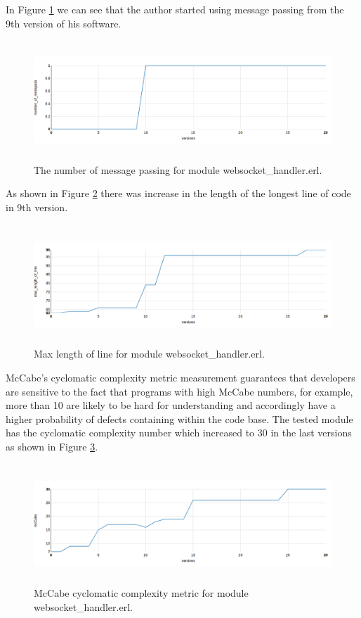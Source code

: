 In Figure \ref{fig:chat} we can see that the author started using message passing from the 9th version of his software.

\begin{figure}[ht]
	\centering
	\includegraphics[height=45mm]{figures/chat.png}
	\caption{The number of message passing for module websocket\_handler.erl.}
	\label{fig:chat}
\end{figure}

As shown in Figure \ref{fig:chat5} there was increase in the length of the longest line of code in 9th version. 
\begin{figure}[ht]
	\centering
	\includegraphics[height=45mm]{figures/chat5.png}
	\caption{Max length of line for module websocket\_handler.erl.}
	\label{fig:chat5}
\end{figure}

McCabe’s cyclomatic complexity metric measurement guarantees that developers are sensitive to the fact that programs with high McCabe numbers, for example, more than 10 are likely to be hard for understanding and accordingly have a higher probability of defects containing within the code base. The tested module has the cyclomatic complexity number which increased to 30 in the last versions as shown in Figure \ref{fig:mcCabe}.

\begin{figure}[ht]
	\centering
	\includegraphics[height=45mm]{figures/mcCabe.png}
	\caption{
	McCabe cyclomatic complexity metric for module websocket\_handler.erl.}
	\label{fig:mcCabe}
\end{figure}

